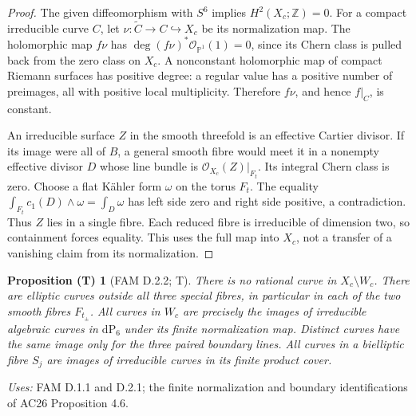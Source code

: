 \documentclass[11pt,a4paper]{article}
\theoremstyle{plain}
\newtheorem{proposition}[theorem]{Proposition (T)}
\theoremstyle{definition}
\begin{document}
\begin{proof}
The given diffeomorphism with \(S^6\) implies \(H^2(X_c;\mathbb Z)=0\).
For a compact irreducible curve \(C\), let
\(\nu:\widetilde C\to C\hookrightarrow X_c\) be its normalization map.
The holomorphic map \(f\nu\) has
\(\deg (f\nu)^*\mathcal O_{\mathbb P^1}(1)=0\), since its Chern class is
pulled back from the zero class on \(X_c\). A nonconstant holomorphic map
of compact Riemann surfaces has positive degree: a regular value has a
positive number of preimages, all with positive local multiplicity.
Therefore \(f\nu\), and hence \(f|_C\), is constant.

An irreducible surface \(Z\) in the smooth threefold is an effective
Cartier divisor. If its image were all of \(B\), a general smooth fibre
would meet it in a nonempty effective divisor \(D\) whose line bundle
is \(\mathcal O_{X_c}(Z)|_{F_t}\). Its integral Chern class is zero.
Choose a flat K\"ahler form \(\omega\) on the torus \(F_t\). The equality
\(\int_{F_t}c_1(D)\wedge\omega=\int_D\omega\) has left side zero and right
side positive, a contradiction. Thus \(Z\) lies in a single fibre.
Each reduced fibre is irreducible of dimension two, so containment forces
equality. This uses the full map into \(X_c\), not a transfer of a
vanishing claim from its normalization.
\end{proof}

\begin{proposition}[FAM D.2.2; T]\label{fam:D.2.2}
There is no rational curve in \(X_c\setminus W_c\). There are elliptic
curves outside all three special fibres, in particular in each of the
two smooth fibres \(F_{t_\pm}\). All curves in \(W_c\) are precisely the
images of irreducible algebraic curves in \(\mathrm{dP}_6\) under its
finite normalization map. Distinct curves have the same image only for
the three paired boundary lines. All curves in a bielliptic fibre
\(S_j\) are images of irreducible curves in its finite product cover.
\end{proposition}
\noindent\emph{Uses:} FAM D.1.1 and D.2.1; the finite normalization and boundary identifications of AC26 Proposition 4.6.\par
\end{document}
